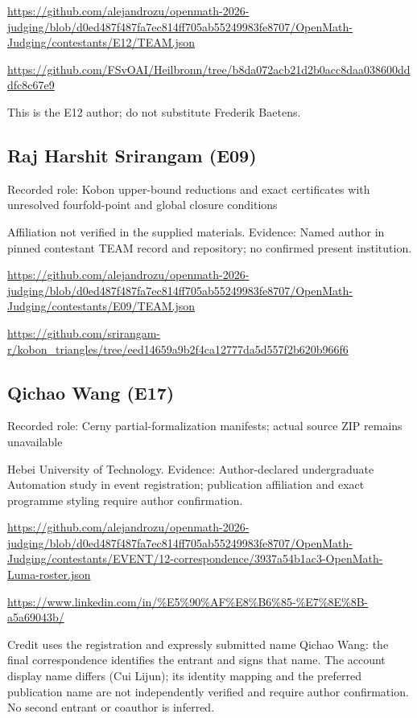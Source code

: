 \documentclass[11pt,a4paper]{article}
\begin{document}
{\small \url{https://github.com/alejandrozu/openmath-2026-judging/blob/d0ed487f487fa7ec814ff705ab55249983fe8707/OpenMath-Judging/contestants/E12/TEAM.json}\par}

{\small \url{https://github.com/FSvOAI/Heilbronn/tree/b8da072acb21d2b0acc8daa038600dddfc8c67e9}\par}

This is the E12 author; do not substitute Frederik Baetens.

\subsection{Raj Harshit Srirangam (E09)}
Recorded role: Kobon upper-bound reductions and exact certificates with unresolved fourfold-point and global closure conditions

Affiliation not verified in the supplied materials. Evidence: Named author in pinned contestant TEAM record and repository; no confirmed present institution.

{\small \url{https://github.com/alejandrozu/openmath-2026-judging/blob/d0ed487f487fa7ec814ff705ab55249983fe8707/OpenMath-Judging/contestants/E09/TEAM.json}\par}

{\small \url{https://github.com/srirangam-r/kobon_triangles/tree/eed14659a9b2f4ca12777da5d557f2b620b966f6}\par}

\subsection{Qichao Wang (E17)}
Recorded role: Cerny partial-formalization manifests; actual source ZIP remains unavailable

Hebei University of Technology. Evidence: Author-declared undergraduate Automation study in event registration; publication affiliation and exact programme styling require author confirmation.

{\small \url{https://github.com/alejandrozu/openmath-2026-judging/blob/d0ed487f487fa7ec814ff705ab55249983fe8707/OpenMath-Judging/contestants/EVENT/12-correspondence/3937a54b1ac3-OpenMath-Luma-roster.json}\par}

{\small \url{https://www.linkedin.com/in/%E5%90%AF%E8%B6%85-%E7%8E%8B-a5a69043b/}\par}

Credit uses the registration and expressly submitted name Qichao Wang: the final correspondence identifies the entrant and signs that name. The account display name differs (Cui Lijun); its identity mapping and the preferred publication name are not independently verified and require author confirmation. No second entrant or coauthor is inferred.
\end{document}
